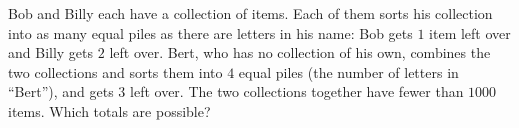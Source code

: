 Bob and Billy each have a collection of items. Each of them sorts his collection into as many equal piles as there are letters in his name: Bob gets $1$ item left over and Billy gets $2$ left over. Bert, who has no collection of his own, combines the two collections and sorts them into $4$ equal piles (the number of letters in ``Bert''), and gets $3$ left over. The two collections together have fewer than $1000$ items. Which totals are possible?

